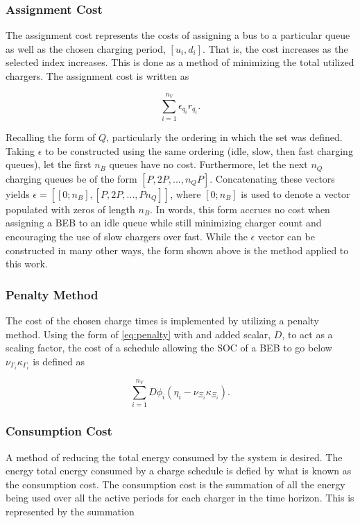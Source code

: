 \documentclass[11pt,a4paper,final]{article}
\begin{document}
\subsubsection{Assignment Cost}
\label{sec:assignment-cost}
The assignment cost represents the costs of assigning a bus to a particular queue as well as the chosen charging period,
\([u_i, d_i]\). That is, the cost increases as the selected index increases. This is done as a method of minimizing the
total utilized chargers. The assignment cost is written as

\begin{equation}
\label{eq:assignment-cost}
\sum_{i=1}^{n_V} \epsilon_{q_i}r_{q_i}\text{.}
\end{equation}

Recalling the form of \(Q\), particularly the ordering in which the set was defined. Taking \(\epsilon\) to be constructed using
the same ordering (idle, slow, then fast charging queues), let the first \(n_B\) queues have no cost. Furthermore, let the
next \(n_Q\) charging queues be of the form \([P, 2P, ..., n_QP]\). Concatenating these vectors yields \(\epsilon = [[0; n_B], [P,
2P, ..., Pn_Q]]\), where \([0; n_B]\) is used to denote a vector populated with zeros of length \(n_B\). In words, this form
accrues no cost when assigning a BEB to an idle queue while still minimizing charger count and encouraging the use of
slow chargers over fast. While the \(\epsilon\) vector can be constructed in many other ways, the form shown above is the method
applied to this work.

\subsubsection{Penalty Method}
\label{sec:penalty-method}
The cost of the chosen charge times is implemented by utilizing a penalty method. Using the form of \ref{eq:penalty} with and
added scalar, \(D\), to act as a scaling factor, the cost of a schedule allowing the SOC of a BEB to go below
\(\nu_{\Gamma_i}\kappa_{\Gamma_i}\) is defined as

\begin{equation}
\label{eq:penalty-method}
\sum_{i=1}^{n_V} D \phi_i(\eta_i - \nu_{\Xi_i} \kappa_{\Xi_i})\text{.}
\end{equation}

\subsubsection{Consumption Cost}
\label{sec:consumpction-cost}
A method of reducing the total energy consumed by the system is desired. The energy total energy consumed by a charge
schedule is defied by what is known as the consumption cost. The consumption cost is the summation of all the energy
being used over all the active periods for each charger in the time horizon. This is represented by the summation
\end{document}
